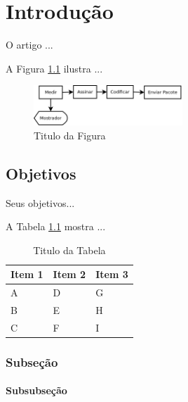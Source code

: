 \OnehalfSpacing
\chapter{Introdução}

O artigo \cite{Wang2013} ...

A Figura \ref{fig:smart_meter} ilustra ...


\begin{figure}[ht]
\begin{center}
    \includegraphics[width=0.5\textwidth]{figs/smartmeter.png}
\end{center}
\caption{Titulo da Figura}
\label{fig:smart_meter}
\end{figure}

\section{Objetivos}

Seus objetivos...

A Tabela \ref{tab:table1} mostra ...


\begin{table}[ht]
\centering
\caption{Titulo da Tabela}
\label{tab:table1}
\begin{tabular}{|l|l|l|}
\hline
\textbf{Item 1} & \textbf{Item 2} & \textbf{Item 3} \\ \hline
A         & D       & G        \\ \hline
B         & E       & H        \\ \hline
C         & F       & I       \\ \hline
\end{tabular}
\end{table}

\subsection{Subseção}

\lipsum[3-56]

\subsubsection{Subsubseção}

